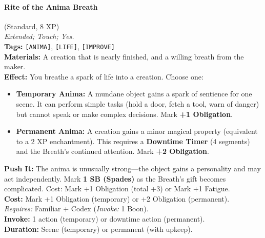 \paragraph{Rite of the Anima Breath} (Standard, 8 XP) \hfill \\
\emph{Extended; Touch; Yes.} \\
\textbf{Tags:} \texttt{[ANIMA]}, \texttt{[LIFE]}, \texttt{[IMPROVE]} \\
\textbf{Materials:} A creation that is nearly finished, and a willing breath from the maker. \\
\textbf{Effect:} You breathe a spark of life into a creation. Choose one:
\begin{itemize}
  \item \textbf{Temporary Anima:} A mundane object gains a spark of sentience for one scene. It can perform simple tasks (hold a door, fetch a tool, warn of danger) but cannot speak or make complex decisions. Mark \textbf{+1 Obligation}.
  \item \textbf{Permanent Anima:} A creation gains a minor magical property (equivalent to a 2 XP enchantment). This requires a \textbf{Downtime Timer} (4 segments) and the Breath's continued attention. Mark \textbf{+2 Obligation}.
\end{itemize}
\textbf{Push It:} The anima is unusually strong---the object gains a personality and may act independently. Mark \textbf{1 SB (Spades)} as the Breath's gift becomes complicated. Cost: Mark +1 Obligation (total +3) or Mark +1 Fatigue. \\
\textbf{Cost:} Mark +1 Obligation (temporary) or +2 Obligation (permanent). \\
\textit{Requires:} Familiar + Codex (\textit{Invoke:} 1 Boon). \\
\textbf{Invoke:} 1 action (temporary) or downtime action (permanent). \\
\textbf{Duration:} Scene (temporary) or permanent (with upkeep).

